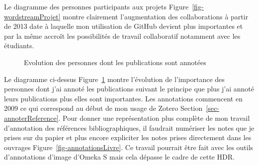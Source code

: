 \documentclass[
  a4paper,
  DIV=11,
  numbers=noendperiod]{scrreprt}
\begin{document}
Le diagramme des personnes participants aux projets
Figure~\ref{fig-wordstreamProjet} montre clairement l'augmentation des
collaborations à partir de 2013 date à laquelle mon utilisation de
GitHub devient plus importantes et par la même accroît les possibilités
de travail collaboratif notamment avec les étudiants.

\begin{figure}


\caption{\label{fig-wordstreamAnnotations}Evolution des personnes dont
les publications sont annotées}

\end{figure}%

Le diagramme ci-dessus Figure~\ref{fig-wordstreamAnnotations} montre
l'évolution de l'importance des personnes dont j'ai annoté les
publications suivant le principe que plus j'ai annoté leurs publications
plus elles sont importantes. Les annotations commencent en 2009 ce qui
correspond au début de mon usage de Zotero
Section~\ref{sec-annoterReference}. Pour donner une représentation plus
complète de mon travail d'annotation des références bibliographiques, il
faudrait numériser les notes que je prises sur du papier et plus encore
expliciter les notes prises directement dans les ouvrages
Figure~\ref{fig-annotationsLivre}. Ce travail pourrait être fait avec
les outils d'annotations d'image d'Omeka S mais cela dépasse le cadre de
cette HDR.
\end{document}
